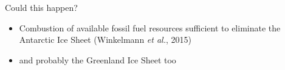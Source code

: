 \documentclass[hide notes,intlimits]{beamer}
\begin{document}
  {
} 

\begin{frame}{Could this happen?}
    \begin{itemize}
      \item Combustion of available fossil fuel resources sufficient to eliminate the Antarctic Ice Sheet (Winkelmann \emph{et al.}, 2015)
      \item and probably the  Greenland Ice Sheet too
    \end{itemize}
\end{frame}


  {
} 
\end{document}
